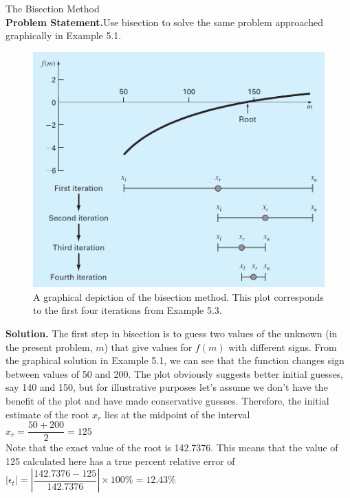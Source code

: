 \documentclass[../main.tex]{subfiles}
\begin{document}
\begin{example} The Bisection Method\\

    \noindent\textbf{Problem Statement.}\quad Use bisection to solve the same problem approached graphically in
    Example 5.1.\\

    \begin{figure}[h]
        \includegraphics[width=0.7\linewidth]{./images/fig_5_5}
        \caption{A graphical depiction of the bisection method. This plot corresponds to the first four iterations
        from Example 5.3.}
    \end{figure}

    \noindent\textbf{Solution.} \quad The first step in bisection is to guess two values of the unknown (in the present
    problem, $m$) that give values for $f (m)$ with different signs. From the graphical solution in 
    Example 5.1, we can see that the function changes sign between values of 50 and 200. The
    plot obviously suggests better initial guesses, say 140 and 150, but for illustrative purposes
    let's assume we don't have the benefit of the plot and have made conservative guesses.
    Therefore, the initial estimate of the root $x_r$ lies at the midpoint of the interval\\

    $x_r = \dfrac{50+200}{2}=125$\\

    \noindent Note that the exact value of the root is 142.7376. This means that the value of 125 calculated
    here has a true percent relative error of\\

    $\left\lvert \epsilon_t \right\rvert = \left\lvert \dfrac{142.7376-125}{142.7376} \right\rvert\times 100\% = 12.43\%$\\


\end{example}
\end{document}
